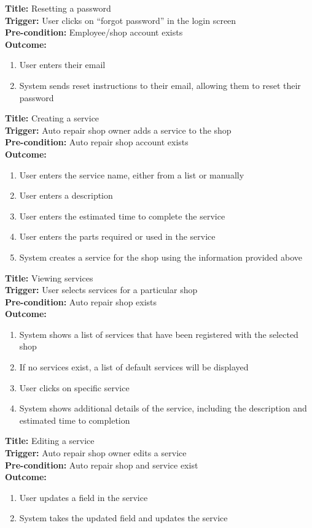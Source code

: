 \documentclass[12pt]{article}
\begin{document}
\textbf{Title:} Resetting a password\\
\textbf{Trigger:} User clicks on ``forgot password'' in the login screen\\
\textbf{Pre-condition:} Employee/shop account exists\\
\textbf{Outcome:}
\begin{enumerate}
	\item User enters their email
	\item System sends reset instructions to their email, allowing them to reset their password
\end{enumerate}

\textbf{Title:} Creating a service\\
\textbf{Trigger:} Auto repair shop owner adds a service to the shop\\
\textbf{Pre-condition:} Auto repair shop account exists\\
\textbf{Outcome:}
\begin{enumerate}
	\item User enters the service name, either from a list or manually
	\item User enters a description
	\item User enters the estimated time to complete the service
	\item User enters the parts required or used in the service
	\item System creates a service for the shop using the information provided above
\end{enumerate}

\textbf{Title:} Viewing services\\
\textbf{Trigger:} User selects services for a particular shop\\
\textbf{Pre-condition:} Auto repair shop exists\\
\textbf{Outcome:}
\begin{enumerate}
	\item System shows a list of services that have been registered with the selected shop
	\item If no services exist, a list of default services will be displayed
	\item User clicks on specific service
	\item System shows additional details of the service, including the description and estimated time to
	      completion
\end{enumerate}

\textbf{Title:} Editing a service\\
\textbf{Trigger:} Auto repair shop owner edits a service\\
\textbf{Pre-condition:} Auto repair shop and service exist\\
\textbf{Outcome:}
\begin{enumerate}
	\item User updates a field in the service
	\item System takes the updated field and updates the service
\end{enumerate}
\end{document}
